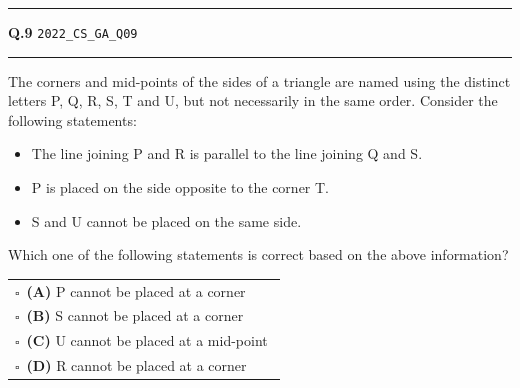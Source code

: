 \documentclass[a4paper,10pt]{article}
\begin{document}
\vspace{6pt}\hrule height 0.35pt\vspace{6pt}
\noindent
\begin{tcolorbox}[
    blanker,
    sidebyside,
    sidebyside align=top,
    lefthand width=0.55\textwidth,
    top=4pt, bottom=4pt, left=0pt, right=0pt,
    middle=16pt,
    underlay={
        \draw[dashed, black!80, line width=0.8pt, dash pattern=on 4pt off 3pt]
            ([xshift=0.55\textwidth+8pt]frame.north west) --
            ([xshift=0.55\textwidth+8pt]frame.south west);
    }
]
\textbf{Q.9}  \hfill {\tiny\texttt{2022\_CS\_GA\_Q09}}
\vspace{2pt}\hrule height 0.3pt\vspace{4pt}

The corners and mid-points of the sides of a triangle are named using the distinct letters P, Q, R, S, T and U, but not necessarily in the same order. Consider the following statements:
\begin{itemize}[itemsep=0pt,topsep=2pt]
\item The line joining P and R is parallel to the line joining Q and S.
\item P is placed on the side opposite to the corner T.
\item S and U cannot be placed on the same side.
\end{itemize}
Which one of the following statements is correct based on the above information?

\par\vspace{6pt}\noindent
\begin{tabular}{@{}p{0.98\linewidth}@{}}
$\square$\ \textbf{(A)} P cannot be placed at a corner \\
\addlinespace[3pt]
$\square$\ \textbf{(B)} S cannot be placed at a corner \\
\addlinespace[3pt]
$\square$\ \textbf{(C)} U cannot be placed at a mid-point \\
\addlinespace[3pt]
$\square$\ \textbf{(D)} R cannot be placed at a corner
\end{tabular}

\tcblower


\end{tcolorbox}
\end{document}
